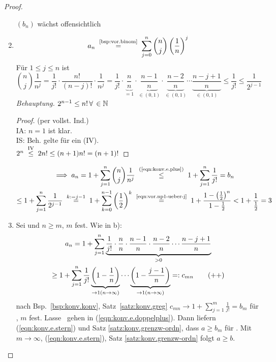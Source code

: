 \documentclass[12pt]{scrreprt}
\begin{document}
\begin{bsp}
\begin{proof}
\begin{enumerate}
      $(b_n)$ wächst offensichtlich
    \item \[a_n \nach{=}{\ref{bsp:vor.binom}}
      \sum_{j=0}^{n}\binom{n}{j}\left(\frac1n\right)^j\] Für $1\le j
      \le n$ ist
      \begin{equation} \label{eqn:konv.e.plus}
        \binom{n}{j}\frac{1}{n^j} =
        \frac{1}{j!}\cdot\frac{n!}{(n-j)!}\cdot\frac{1}{n^j} =
        \frac{1}{j!}\cdot\underbrace{\frac{n}{n}}_{=1}\cdot\underbrace{\frac{n-1}{n}}_{\in(0,1)}\cdot\underbrace{\frac{n-2}{n}}_{\in(0,1)}\dotsm\underbrace{\frac{n-j+1}{n}}_{\in(0,1)}
        \le \frac{1}{j!} \le \frac{1}{2^{j-1}}
        \tag{$+$} \end{equation} \emph{Behauptung.} $2^{n-1}\le
      n!\,\forall\,\in\mathbb{N}$
      \begin{proof} (per vollst. Ind.)\\
        IA: $n=1$ ist klar.\\
        IS: Beh. gelte für ein  (IV).\\
        \folgt $2^n \nach{\le}{IV} 2n! \le (n+1)n! = (n+1)!$
      \end{proof}
      \begin{multline*}
        \folgt a_n=1+\sum_{j=1}^{n}\binom{n}{j}\frac{1}{n^j} \nach{\le}{(\ref{eqn:konv.e.plus})} 1 + \sum_{j=1}^{n} \frac{1}{j!} = b_n\\
        \le 1+\sum_{j=1}^{n} \frac{1}{2^{j-1}} \wegen{=}{k:=j-1} 1 +
        \sum_{k=0}^{n-1} \left(\frac12\right)^k
        \nach{=}{\ref{eqn:vor.np1-ueber-j}}
        1+\frac{1-\left(\frac12\right)^n}{1-\frac12} < 1 +
        \frac{1}{\frac12} = 3
      \end{multline*}
    \item Sei  und $n\ge m$, $m$ fest. Wie in b):
      \begin{multline*} \label{eqn:konv.e.doppelplus}
        a_n=1+\sum_{j=1}^{n}\underbrace{\frac{1}{j!}\cdot\frac{n}{n}\cdot\frac{n-1}{n}\cdot\frac{n-2}{n}\dotsm\frac{n-j+1}{n}}_{>0}\\\ge
        1+\sum_{j=1}^{n}\frac{1}{j!}\underbrace{\left(1-\frac1n\right)}_{\to1(n\rightarrow\infty)}\dotsm\underbrace{\left(1-\frac{j-1}{n}\right)}_{\to1(n\rightarrow\infty)}=:c_{mn}
        \tag{$++$}
      \end{multline*}
      nach Bsp.~\ref{bsp:konv.konv}, Satz~\ref{satz:konv.greg} \folgt
      $c_{mn}\to 1+\sum_{j=1}^{m} \frac{1}{j!}=b_m$ für \ninf, $m$
      fest. Lasse \ninf \ gehen in (\ref{eqn:konv.e.doppelplus}). Dann
      liefern (\ref{eqn:konv.e.stern}) und Satz
      \ref{satz:konv.grenzw-ordn}, dass $a\ge b_m$ für . Mit
      $m\to\infty$, (\ref{eqn:konv.e.stern}), Satz
      \ref{satz:konv.grenzw-ordn} folgt $a\ge b$.
    \end{enumerate}
  \end{proof}
\end{bsp}
\end{document}
